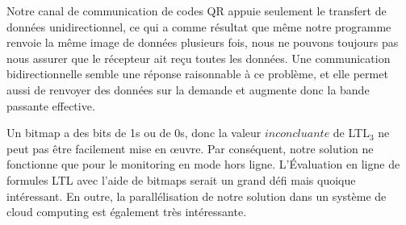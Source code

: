 Notre canal de communication de codes QR appuie seulement le transfert de données unidirectionnel, ce qui a comme résultat que même notre programme renvoie la même image de données plusieurs fois, nous ne pouvons toujours pas nous assurer que le récepteur ait reçu toutes les données. Une communication bidirectionnelle semble une réponse raisonnable à ce problème, et elle permet aussi de renvoyer des données sur la demande et augmente donc la bande passante effective.

Un bitmap a des bits de 1s ou de 0s, donc la valeur $inconcluante$ de LTL$_3$ ne peut pas être facilement mise en \oe{}uvre. Par conséquent, notre solution ne fonctionne que pour le monitoring en mode hors ligne. L'Évaluation en ligne de formules LTL avec l'aide de bitmaps serait un grand défi mais quoique intéressant. En outre, la parallélisation de notre solution dans un système de cloud computing est également très intéressante.
